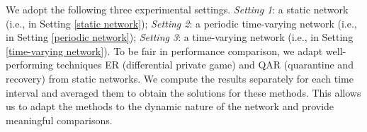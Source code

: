 \documentclass[lettersize,journal]{IEEEtran}
\begin{document}
We adopt the following three experimental settings. \emph{Setting 1}: a static network (i.e., in Setting \ref{static network}); \emph{Setting 2}: a periodic time-varying network (i.e., in Setting \ref{periodic network}); \emph{Setting 3}: a time-varying network (i.e., in Setting \ref{time-varying network}). To be fair in performance comparison, we adapt well-performing techniques  ER \cite{yeDifferentiallyPrivateGame2021} (differential private game) and QAR \cite{yangEffectiveQuarantineRecovery2021} (quarantine and recovery) from static networks. We compute the results separately for each time interval and averaged them to obtain the solutions for these methods. This allows us to adapt the methods to the dynamic nature of the network and provide meaningful comparisons. \par
\end{document}
